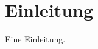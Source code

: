 \documentclass[../Abschlussarbeit.tex]{subfiles}
\begin{document}
\section{Einleitung}

Eine Einleitung.
\end{document}
